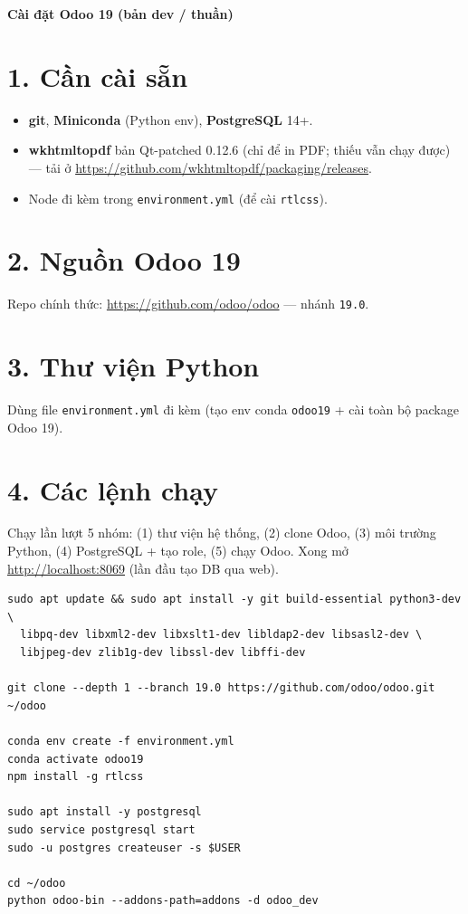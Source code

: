 \documentclass[11pt,a4paper]{article}
\begin{document}
\begin{center}{\LARGE\bfseries Cài đặt Odoo 19 (bản dev / thuần)}\end{center}
\vspace{4pt}

\section*{1. Cần cài sẵn}
\begin{itemize}[nosep]
  \item \textbf{git}, \textbf{Miniconda} (Python env), \textbf{PostgreSQL} 14+.
  \item \textbf{wkhtmltopdf} bản Qt-patched 0.12.6 (chỉ để in PDF; thiếu vẫn chạy được) --- tải ở \url{https://github.com/wkhtmltopdf/packaging/releases}.
  \item Node đi kèm trong \texttt{environment.yml} (để cài \texttt{rtlcss}).
\end{itemize}

\section*{2. Nguồn Odoo 19}
Repo chính thức: \url{https://github.com/odoo/odoo} --- nhánh \texttt{19.0}.

\section*{3. Thư viện Python}
Dùng file \texttt{environment.yml} đi kèm (tạo env conda \texttt{odoo19} + cài toàn bộ package Odoo 19).

\section*{4. Các lệnh chạy}
Chạy lần lượt 5 nhóm: (1) thư viện hệ thống, (2) clone Odoo, (3) môi trường Python,
(4) PostgreSQL + tạo role, (5) chạy Odoo. Xong mở \url{http://localhost:8069}
(lần đầu tạo DB qua web).

\begin{lstlisting}
sudo apt update && sudo apt install -y git build-essential python3-dev \
  libpq-dev libxml2-dev libxslt1-dev libldap2-dev libsasl2-dev \
  libjpeg-dev zlib1g-dev libssl-dev libffi-dev

git clone --depth 1 --branch 19.0 https://github.com/odoo/odoo.git ~/odoo

conda env create -f environment.yml
conda activate odoo19
npm install -g rtlcss

sudo apt install -y postgresql
sudo service postgresql start
sudo -u postgres createuser -s $USER

cd ~/odoo
python odoo-bin --addons-path=addons -d odoo_dev
\end{lstlisting}
\end{document}
